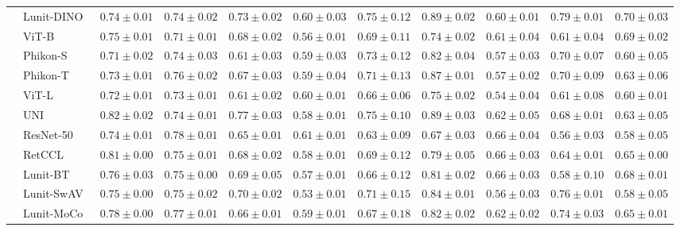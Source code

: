 \begin{tabular}{ll|cccc|c|cccc}
 & Lunit-DINO~\cite{kang2023benchmarking} & $0.74 \pm 0.01$ & $0.74 \pm 0.02$ & $0.73 \pm 0.02$ & $0.60 \pm 0.03$ & $0.75 \pm 0.12$ & $0.89 \pm 0.02$ & $0.60 \pm 0.01$ & $\mathbf{0.79 \pm 0.01}$ & $\mathbf{0.70 \pm 0.03}$ \\
 & ViT-B~\cite{kolesnikov2021image} & $0.75 \pm 0.01$ & $0.71 \pm 0.01$ & $0.68 \pm 0.02$ & $0.56 \pm 0.01$ & $0.69 \pm 0.11$ & $0.74 \pm 0.02$ & $0.61 \pm 0.04$ & $0.61 \pm 0.04$ & $0.69 \pm 0.02$ \\
 & Phikon-S~\cite{filiot2023scaling} & $0.71 \pm 0.02$ & $0.74 \pm 0.03$ & $0.61 \pm 0.03$ & $0.59 \pm 0.03$ & $0.73 \pm 0.12$ & $0.82 \pm 0.04$ & $0.57 \pm 0.03$ & $0.70 \pm 0.07$ & $0.60 \pm 0.05$ \\
 & Phikon-T~\cite{filiot2023scaling} & $0.73 \pm 0.01$ & $0.76 \pm 0.02$ & $0.67 \pm 0.03$ & $0.59 \pm 0.04$ & $0.71 \pm 0.13$ & $0.87 \pm 0.01$ & $0.57 \pm 0.02$ & $0.70 \pm 0.09$ & $0.63 \pm 0.06$ \\
 & ViT-L~\cite{kolesnikov2021image} & $0.72 \pm 0.01$ & $0.73 \pm 0.01$ & $0.61 \pm 0.02$ & $0.60 \pm 0.01$ & $0.66 \pm 0.06$ & $0.75 \pm 0.02$ & $0.54 \pm 0.04$ & $0.61 \pm 0.08$ & $0.60 \pm 0.01$ \\
 & UNI~\cite{chen2024uni} & $\mathbf{0.82 \pm 0.02}$ & $0.74 \pm 0.01$ & $\mathbf{0.77 \pm 0.03}$ & $0.58 \pm 0.01$ & $\mathbf{0.75 \pm 0.10}$ & $\mathbf{0.89 \pm 0.03}$ & $0.62 \pm 0.05$ & $0.68 \pm 0.01$ & $0.63 \pm 0.05$ \\
 & ResNet-50~\cite{he2015deep} & $0.74 \pm 0.01$ & $\mathbf{0.78 \pm 0.01}$ & $0.65 \pm 0.01$ & $0.61 \pm 0.01$ & $0.63 \pm 0.09$ & $0.67 \pm 0.03$ & $0.66 \pm 0.04$ & $0.56 \pm 0.03$ & $0.58 \pm 0.05$ \\
 & RetCCL~\cite{wang2023retccl} & $0.81 \pm 0.00$ & $0.75 \pm 0.01$ & $0.68 \pm 0.02$ & $0.58 \pm 0.01$ & $0.69 \pm 0.12$ & $0.79 \pm 0.05$ & $0.66 \pm 0.03$ & $0.64 \pm 0.01$ & $0.65 \pm 0.00$ \\
 & Lunit-BT~\cite{kang2023benchmarking} & $0.76 \pm 0.03$ & $0.75 \pm 0.00$ & $0.69 \pm 0.05$ & $0.57 \pm 0.01$ & $0.66 \pm 0.12$ & $0.81 \pm 0.02$ & $0.66 \pm 0.03$ & $0.58 \pm 0.10$ & $0.68 \pm 0.01$ \\
 & Lunit-SwAV~\cite{kang2023benchmarking} & $0.75 \pm 0.00$ & $0.75 \pm 0.02$ & $0.70 \pm 0.02$ & $0.53 \pm 0.01$ & $0.71 \pm 0.15$ & $0.84 \pm 0.01$ & $0.56 \pm 0.03$ & $0.76 \pm 0.01$ & $0.58 \pm 0.05$ \\
 & Lunit-MoCo~\cite{kang2023benchmarking} & $0.78 \pm 0.00$ & $0.77 \pm 0.01$ & $0.66 \pm 0.01$ & $0.59 \pm 0.01$ & $0.67 \pm 0.18$ & $0.82 \pm 0.02$ & $0.62 \pm 0.02$ & $0.74 \pm 0.03$ & $0.65 \pm 0.01$ \\
\cline{1-11}
\bottomrule
\end{tabular}
